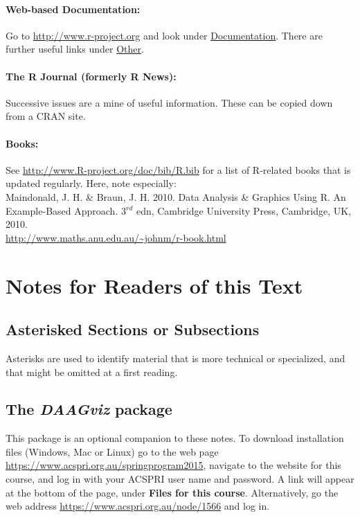 \documentclass{tufte-book}\usepackage[]{graphicx}\usepackage[]{color}
\begin{document}
\paragraph{Web-based Documentation:}

Go to \url{http://www.r-project.org}
and look under \underline{Documentation}.
There are further useful links under \underline{Other}.

\paragraph{The R Journal (formerly R News):}
Successive issues are a mine of useful information.
These can be copied down from a CRAN site.

\paragraph{Books:}
See \url{http://www.R-project.org/doc/bib/R.bib} for a list of
R-related books that is updated regularly. Here, note
especially:\\[3pt]
\noindent
Maindonald, J. H. \& Braun, J. H. 2010. Data Analysis \&
  Graphics Using R. An Example-Based Approach. 3$^{rd}$ edn, Cambridge
  University Press,
  Cambridge, UK, 2010.\\
\noindent
\url{http://www.maths.anu.edu.au/~johnm/r-book.html}

\cleardoublepage
\section*{Notes for Readers of this Text}

\subsection*{Asterisked Sections or Subsections}

Asterisks are used to identify material that is more technical or
specialized, and that might be omitted at a first reading.

\subsection*{The {\em DAAGviz} package}
This package is an optional companion to these notes. To
download installation files (Windows, Mac or Linux) go to
the web page \url{https://www.acspri.org.au/springprogram2015},
navigate to the website for this course, and log in with
your ACSPRI user name and password.  A link will appear
at the bottom of the page, under {\bf Files for this course}.
Alternatively, go the web address \url{https://www.acspri.org.au/node/1566} and log in.
\end{document}
